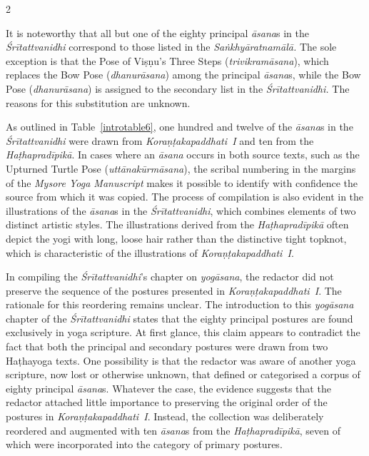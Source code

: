 \begin{nohyp}
\begin{multicols*}{2}
\begin{eng}
It is noteworthy that all but one of the eighty principal \emph{āsana}s in the \emph{Śrītattvanidhi} correspond to those listed in the \emph{Saṅkhyāratnamālā.} The sole exception is that the Pose of Viṣṇu's Three Steps (\emph{trivikramāsana}), which replaces the Bow Pose (\emph{dhanurāsana}) among the principal \emph{āsana}s, while the Bow Pose (\emph{dhanurāsana}) is assigned to the secondary list in the \emph{Śrītattvanidhi.} The reasons for this substitution are unknown.

As outlined in Table~\ref{introtable6}, one hundred and twelve of the \emph{āsana}s in the \emph{Śrītattvanidhi} were drawn from \emph{Koraṇṭakapaddhati~I} and ten from the \emph{Haṭhapradīpikā}. In cases where an \emph{āsana} occurs in both source texts, such as the Upturned Turtle Pose (\emph{uttānakūrmāsana}), the scribal numbering in the margins of the \emph{Mysore Yoga Manuscript} makes it possible to identify with confidence the source from which it was copied. The process of compilation is also evident in the illustrations of the \emph{āsana}s in the \emph{Śrītattvanidhi}, which combines elements of two distinct artistic styles. The illustrations derived from the \emph{Haṭhapradīpikā} often depict the yogi with long, loose hair rather than the distinctive tight topknot, which is characteristic of the illustrations of \emph{Koraṇṭakapaddhati~I}.

In compiling the \emph{Śrītattvanidhi}'s chapter on \emph{yogāsana}, the redactor did not preserve the sequence of the postures presented in \emph{Koraṇṭakapaddhati~I}. The rationale for this reordering remains unclear. The introduction to this \emph{yogāsana} chapter of the \emph{Śrītattvanidhi} states that the eighty principal postures are found exclusively in yoga scripture. At first glance, this claim appears to contradict the fact that both the principal and secondary postures were drawn from two Haṭhayoga texts. One possibility is that the redactor was aware of another yoga scripture, now lost or otherwise unknown, that defined or categorised a corpus of eighty principal \emph{āsana}s. Whatever the case, the evidence suggests that the redactor attached little importance to preserving the original order of the postures in \emph{Koraṇṭakapaddhati~I}. Instead, the collection was deliberately reordered and augmented with ten \emph{āsana}s from the \emph{Haṭhapradīpikā}, seven of which were incorporated into the category of primary postures.
\end{eng}
\end{multicols*}
\newpage
~
\newpage
\null\vskip 0.1cm


\end{nohyp}
